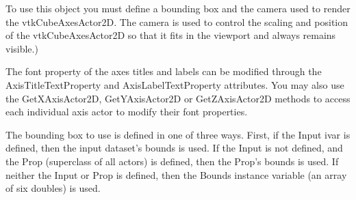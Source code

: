 To use this object you must define a bounding box and the camera used to render the vtk\-Cube\-Axes\-Actor2\-D. The camera is used to control the scaling and position of the vtk\-Cube\-Axes\-Actor2\-D so that it fits in the viewport and always remains visible.)

The font property of the axes titles and labels can be modified through the Axis\-Title\-Text\-Property and Axis\-Label\-Text\-Property attributes. You may also use the Get\-X\-Axis\-Actor2\-D, Get\-Y\-Axis\-Actor2\-D or Get\-Z\-Axis\-Actor2\-D methods to access each individual axis actor to modify their font properties.

The bounding box to use is defined in one of three ways. First, if the Input ivar is defined, then the input dataset's bounds is used. If the Input is not defined, and the Prop (superclass of all actors) is defined, then the Prop's bounds is used. If neither the Input or Prop is defined, then the Bounds instance variable (an array of six doubles) is used.

